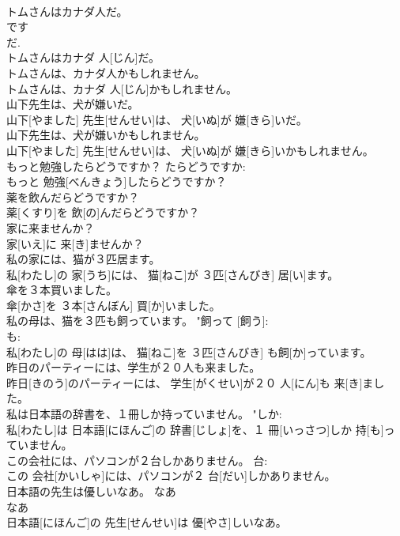 \documentclass[8pt]{extreport}
\begin{document}
\begin{CJK}{UTF8}{min}
\\	トムさんはカナダ人だ。	
\\	です 
\\	だ. 
\\	トムさんはカナダ 人[じん]だ。	
\\	トムさんは、カナダ人かもしれません。	
\\	トムさんは、カナダ 人[じん]かもしれません。	
\\	山下先生は、犬が嫌いだ。	
\\	山下[やました] 先生[せんせい]は、 犬[いぬ]が 嫌[きら]いだ。	
\\	山下先生は、犬が嫌いかもしれません。	
\\	山下[やました] 先生[せんせい]は、 犬[いぬ]が 嫌[きら]いかもしれません。	
\\	もっと勉強したらどうですか？	たらどうですか: 
\\	もっと 勉強[べんきょう]したらどうですか？	
\\	薬を飲んだらどうですか？	
\\	薬[くすり]を 飲[の]んだらどうですか？	
\\	家に来ませんか？	
\\	家[いえ]に 来[き]ませんか？	
\\	私の家には、猫が３匹居ます。	
\\	私[わたし]の 家[うち]には、 猫[ねこ]が ３匹[さんびき] 居[い]ます。	
\\	傘を３本買いました。	
\\	傘[かさ]を ３本[さんぼん] 買[か]いました。	
\\	私の母は、猫を３匹も飼っています。	"飼って [飼う]: 
\\	も: 
\\	私[わたし]の 母[はは]は、 猫[ねこ]を ３匹[さんびき] も飼[か]っています。	
\\	昨日のパーティーには、学生が２０人も来ました。	
\\	昨日[きのう]のパーティーには、 学生[がくせい]が２０ 人[にん]も 来[き]ました。	
\\	私は日本語の辞書を、１冊しか持っていません。	"しか: 
\\	私[わたし]は 日本語[にほんご]の 辞書[じしょ]を、１ 冊[いっさつ]しか 持[も]っていません。	
\\	この会社には、パソコンが２台しかありません。	台: 
\\	この 会社[かいしゃ]には、パソコンが２ 台[だい]しかありません。	
\\	日本語の先生は優しいなあ。	なあ 
\\	なあ 
\\	日本語[にほんご]の 先生[せんせい]は 優[やさ]しいなあ。	

\end{CJK}
\end{document}
